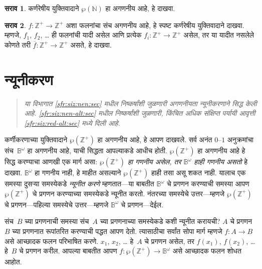 \documentclass[11pt,a4paper,openany]{book}
\theoremstyle{definition}
\newtheorem{prob}{सराव}[chapter]
\newcommand{\Pow}[1]{\wp(#1)}
\newcommand{\Nat}{\mathbb{N}}
\newcommand{\PosInt}{\mathbb{Z}^{+}}
\newcommand{\Bin}{\mathbb{B}}
\newenvironment{editorial}{\begin{quote}\small\itshape}{\end{quote}}
\begin{document}
\begin{prob}
कर्णरेषीय युक्तिवादाने $\Pow{\Nat}$ हा अगणनीय आहे, हे दाखवा.
\end{prob}

\begin{prob}\label{sfr:siz:nen:prob:f-posint}
$f \colon \PosInt \to \PosInt$ अशा फलनांचा संच अगणनीय
आहे, हे स्पष्ट कर्णरेषीय युक्तिवादाने दाखवा. म्हणजे, $f_1$, $f_2$,
\dots{} ही फलनांची यादी असेल आणि प्रत्येक $f_i\colon
\PosInt \to \PosInt$ असेल, तर या यादीत नसलेले कोणते तरी
$\overline{f}\colon \PosInt \to \PosInt$ असते, हे दाखवा.
\end{prob}









\section{न्यूनीकरण}\label{sfr:siz:red:sec}

\begin{editorial}
  या विभागात \ref{sfr:siz:nen:sec} मधील निष्कर्षांशी जुळणारी अगणनीयता
  न्यूनीकरणाने सिद्ध केली आहे. \ref{sfr:siz:nen-alt:sec} मधील निष्कर्षांशी
  जुळणारी, किंचित अधिक संक्षिप्त पर्यायी आवृत्ती \ref{sfr:siz:red-alt:sec}
  मध्ये दिली आहे.
\end{editorial}

कर्णीकरणाच्या युक्तिवादाने $\Pow{\PosInt}$ हा अगणनीय आहे,
हे आपण दाखवले. सर्व अनंत $0$--$1$ अनुक्रमांचा संच~$\Bin^\omega$ हा
अगणनीय आहे, याची सिद्धता आपल्याकडे आधीच होती.
$\Pow{\PosInt}$ हा अगणनीय आहे हे सिद्ध करण्याचा आणखी एक मार्ग
असा: \emph{$\Pow{\PosInt}$ हा गणनीय असेल, तर $\Bin^\omega$
  हाही गणनीय असतो} हे दाखवा. $\Bin^\omega$ हा गणनीय
नाही, हे माहीत असल्याने $\Pow{\PosInt}$ हाही तसा असू शकत नाही. यालाच
एक समस्या दुसऱ्या समस्येकडे \emph{न्यूनीत करणे} म्हणतात---या बाबतीत
$\Bin^\omega$ चे प्रगणन करण्याची समस्या आपण $\Pow{\PosInt}$ चे प्रगणन
करण्याच्या समस्येकडे न्यूनीत करतो. नंतरच्या समस्येचे उत्तर---म्हणजे
$\Pow{\PosInt}$ चे प्रगणन---पहिल्या समस्येचे उत्तर---म्हणजे
$\Bin^\omega$ चे प्रगणन---देईल.

संच~$B$ च्या प्रगणनाची समस्या संच~$A$ च्या प्रगणनाच्या समस्येकडे कशी
न्यूनीत करायची? $A$ चे प्रगणन $B$ च्या प्रगणनात रूपांतरित करण्याची
पद्धत आपण देतो. त्यासाठीचा सर्वांत सोपा मार्ग म्हणजे
$f\colon A \to B$ असे आच्छादक फलन परिभाषित करणे. $x_1$, $x_2$,
\dots{} हे~$A$ चे प्रगणन असेल, तर $f(x_1)$, $f(x_2)$, \dots{} हे~$B$
चे प्रगणन करील. आपल्या बाबतीत आपण
$f\colon \Pow{\PosInt} \to \Bin^\omega$ असे आच्छादक फलन शोधत आहोत.
\end{document}
